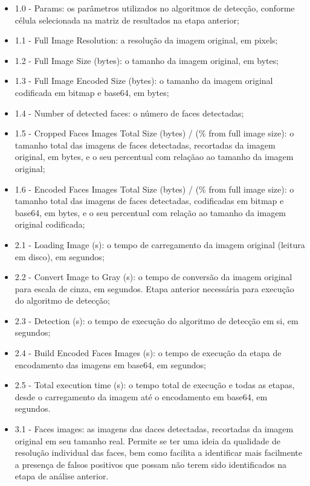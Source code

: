 \begin{itemize}
    \item 1.0 - Params: os parâmetros utilizados no algoritmos de detecção, conforme célula selecionada na matriz de resultados na etapa anterior;
    \item 1.1 - Full Image Resolution: a resolução da imagem original, em pixels;
    \item 1.2 - Full Image Size (bytes): o tamanho da imagem original, em bytes;
    \item 1.3 - Full Image Encoded Size (bytes): o tamanho da imagem original codificada em bitmap e base64, em bytes;
    \item 1.4 - Number of detected faces: o número de faces detectadas;
    \item 1.5 - Cropped Faces Images Total Size (bytes) / (\% from full image size): o tamanho total das imagens de faces detectadas, recortadas da imagem original, em bytes, e o seu percentual com relaçãao ao tamanho da imagem original;
    \item 1.6 - Encoded Faces Images Total Size (bytes) / (\% from full image size): o tamanho total das imagens de faces detectadas, codificadas em bitmap e base64, em bytes, e o seu percentual com relação ao tamanho da imagem original codificada;
    \item 2.1 - Loading Image (s): o tempo de carregamento da imagem original (leitura em disco), em segundos;
    \item 2.2 - Convert Image to Gray (s): o tempo de conversão da imagem original para escala de cinza, em segundos. Etapa anterior necessária para execução do algoritmo de detecção;
    \item 2.3 - Detection (s): o tempo de execução do algoritmo de detecção em si, em segundos;
    \item 2.4 - Build Encoded Faces Images (s): o tempo de execução da etapa de encodamento das imagens em base64, em segundos;
    \item 2.5 - Total execution time (s): o tempo total de execução e todas as etapas, desde o carregamento da imagem até o encodamento em base64, em segundos.
    \item 3.1 - Faces images: as imagens das daces detectadas, recortadas da imagem original em seu tamanho real. Permite se ter uma ideia da qualidade de resolução individual das faces, bem como facilita a identificar mais facilmente a presença de falsos positivos que possam não terem sido identificados na etapa de análise anterior.
\end{itemize}

